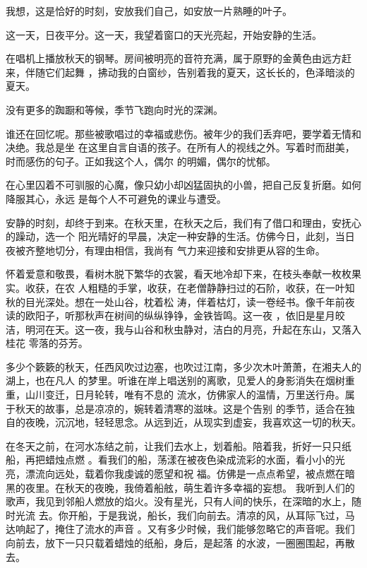 \documentclass[12pt,a4paper]{article}
\begin{document}
		我想，这是恰好的时刻，安放我们自己，如安放一片熟睡的叶子。


		这一天，日夜平分。这一天，我望着窗口的天光亮起，开始安静的生活。

		在唱机上播放秋天的钢琴。房间被明亮的音符充满，属于原野的金黄色由远方赶来，伴随它们起舞
	，拂动我的白窗纱，告别着我的夏天，这长长的，色泽暗淡的夏天。

		没有更多的踟蹰和等候，季节飞跑向时光的深渊。

		谁还在回忆呢。那些被歌唱过的幸福或悲伤。被年少的我们丢弃吧，要学着无情和决绝。我总是坐
	在这里自言自语的孩子。在所有人的视线之外。写着时而甜美，时而感伤的句子。正如我这个人，偶尔
	的明媚，偶尔的忧郁。

		在心里囚着不可驯服的心魔，像只幼小却凶猛固执的小兽，把自己反复折磨。如何降服其心，永远
	是每个人不可避免的课业与遭受。

		安静的时刻，却终于到来。在秋天里，在秋天之后，我们有了借口和理由，安抚心的躁动，选一个
	阳光晴好的早晨，决定一种安静的生活。仿佛今日，此刻，当日夜被齐整地切分，有理由相信，我尚有
	气力来迎接和安排更从容的生命。

		怀着爱意和敬畏，看树木脱下繁华的衣裳，看天地冷却下来，在枝头奉献一枚枚果实。收获，在农
	人粗糙的手掌，收获，在老僧静静扫过的石阶，收获，在一叶知秋的目光深处。想在一处山谷，枕着松
	涛，伴着枯灯，读一卷经书。像千年前夜读的欧阳子，听那秋声在树间的纵纵铮铮，金铁皆鸣。这一夜
	，依旧是星月皎洁，明河在天。这一夜，我与山谷和秋虫静对，洁白的月亮，升起在东山，又落入桂花
	零落的芬芳。

		多少个簌簌的秋天，任西风吹过边塞，也吹过江南，多少次木叶萧萧，在湘夫人的湖上，也在凡人
	的梦里。听谁在岸上唱送别的离歌，见爱人的身影消失在烟树重重，山川变迁，日月轮转，唯有不息的
	流水，仿佛家人的温情，万里送行舟。属于秋天的故事，总是凉凉的，婉转着清寒的滋味。这是个告别
	的季节，适合在独自的夜晚，沉沉地，轻轻思念。从远到近，从现实到虚妄，我喜欢这一切的秋天。

		在冬天之前，在河水冻结之前，让我们去水上，划着船。陪着我，折好一只只纸船，再把蜡烛点燃
	。看我们的船，荡漾在被夜色染成流彩的水面，看小小的光亮，漂流向远处，载着你我虔诚的愿望和祝
	福。仿佛是一点点希望，被点燃在暗黑的夜里。在秋天的夜晚，我倚着船舷，萌生着许多幸福的妄想。
	我听到人们的歌声，我见到邻船人燃放的焰火。没有星光，只有人间的快乐，在深暗的水上，随时光流
	去。你开船，于是我说，船长，我们向前去。清凉的风，从耳际飞过，马达响起了，掩住了流水的声音
	。又有多少时候，我们能够忽略它的声音呢。我们向前去，放下一只只载着蜡烛的纸船，身后，是起落
	的水波，一圈圈围起，再散去。
\end{document}
